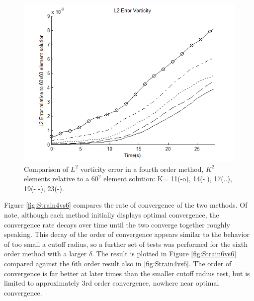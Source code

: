 \documentclass[letterpaper,12pt]{report}
\begin{document}
\begin{figure}
\centering
\includegraphics[width=1\textwidth]{StrainL2.PNG}
\caption{\label{fig:StrainL2}Comparison of $L^2$ vorticity error in a fourth order method, $K^2$ elements relative to a $60^2$ element solution: K= 11(-o), 14(-.), 17(..), 19(- -), 23(-). }
\end{figure}

Figure \ref{fig:Strain4vs6} compares the rate of convergence of the two methods. Of note, although each method initially displays optimal convergence, the convergence rate decays over time until the two converge together roughly speaking. This decay of the order of convergence appears similar to the behavior of too small a cutoff radius, so a further set of tests was performed for the sixth order method with a larger $\delta$. The result is plotted in Figure \ref{fig:Strain6vs6} compared against the 6th order result also in \ref{fig:Strain4vs6}. The order of convergence is far better at later times than the smaller cutoff radius test, but is limited to approximately 3rd order convergence, nowhere near optimal convergence.
\end{document}
